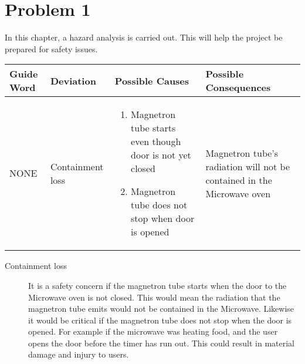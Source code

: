 \chapter{Problem 1}
\label{chp:one}


In this chapter, a hazard analysis is carried out. This will help the project be prepared for safety issues. 

\begin{center}
	\begin{tabular}{p{2.1cm} | p{2.9cm} | p{5cm} | p{4cm} }
		Guide Word & Deviation & Possible Causes & Possible Consequences \\\hline
		NONE & Containment loss & 
		\begin{enumerate}
			\item Magnetron tube starts even though door is not yet closed 
			\item Magnetron tube does not stop when door is opened 
		\end{enumerate}
		 & Magnetron tube's radiation will not be contained in the Microwave oven \\\hline
		
	\end{tabular}
\end{center}

\begin{description}
	\item[Containment loss] It is a safety concern if the magnetron tube starts when the door to the Microwave oven is not closed. This would mean the radiation that the magnetron tube emits would not be contained in the Microwave. Likewise it would be critical if the magnetron tube does not stop when the door is opened. For example if the microwave was heating food, and the user opens the door before the timer has run out. This could result in material damage and injury to users.
\end{description}